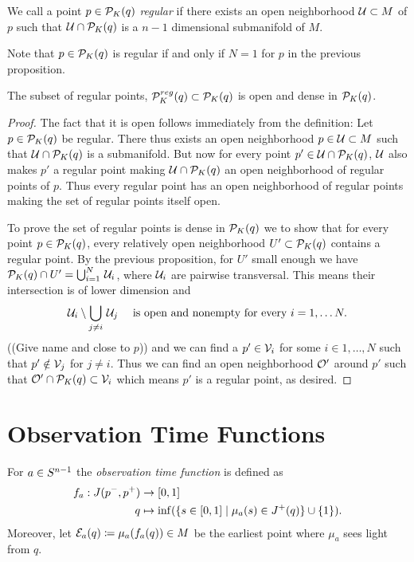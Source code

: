 \begin{definition}\label{def:regpt}
We call a point $p\in {\mathcal{P}}_K(q)$ \emph{regular} if there exists an open neighborhood ${\mathcal{U}}\subset M$ of $p$ such that ${\mathcal{U}}\cap {\mathcal{P}}_K(q)$ is a $n-1$ dimensional submanifold of $M$.

Note that $p\in {\mathcal{P}}_K(q)$ is regular if and only if $N=1$ for $p$ in the previous proposition.
\end{definition}


\begin{corollary}\label{cor:opendense}
    The subset of regular points, ${\mathcal{P}}^{reg}_K(q)\subset {\mathcal{P}}_K(q)$ is open and dense in ${\mathcal{P}}_K(q)$.
\end{corollary}
\begin{proof}
The fact that it is open follows immediately from the definition: Let $p\in {\mathcal{P}}_K(q)$ be regular. There thus exists an open neighborhood $p\in {\mathcal{U}}\subset M$ such that $\mathcal{U} \cap {\mathcal{P}}_K(q)$ is a submanifold. But now for every point $p'\in \mathcal{U}\cap{\mathcal{P}}_K(q)$, ${\mathcal{U}}$ also makes $p'$ a regular point making $\mathcal{U}\cap{\mathcal{P}}_K(q)$ an open neighborhood of regular points of $p$. Thus every regular point has an open neighborhood of regular points making the set of regular points itself open.

To prove the set of regular points is dense in ${{\mathcal{P}}_K(q)}$ we to show that for every point $p\in {\mathcal{P}}_K(q)$, every relatively open neighborhood $U'\subset{\mathcal{P}}_K(q)$ contains a regular point. By the previous proposition, for $U'$ small enough we have ${\mathcal{P}}_K(q)\cap U' = \bigcup_{i=1}^N\,\mathcal{U}_i$, where $\mathcal{U}_i$ are pairwise transversal. This means their intersection is of lower dimension and 
\[
    \mathcal{U}_i \setminus \bigcup_{j\neq i}\, \mathcal{U}_j \quad \text{ is open and nonempty for every }i=1,\dots N.
\]
((Give name and close to $p$))
and we can find a $p'\in {\mathcal{V}}_i$ for some $i\in 1,\dots,N$ such that $p'\notin {\mathcal{V}}_j$ for $j\neq i$. Thus we can find an open neighborhood ${\mathcal{O}}'$ around $p'$ such that ${\mathcal{O}}'\cap {\mathcal{P}}_K(q)\subset {\mathcal{V}}_i$ which means $p'$ is a regular point, as desired.
\end{proof}

\section{Observation Time Functions}
\begin{definition}\label{def:observationtime}
For $a\in {S^{n-1}}$ the \emph{observation time function} 
is defined as 
\begin{align*}
    f_a:J(p^-,p^+)&\to [0,1]\\
    q&\mapsto\inf(\{s\in [0,1] \mid \mu_a(s)\in J^+(q)\}\cup \{1\}).
\end{align*}
Moreover, let ${\mathcal{E}}_a(q)\coloneqq\mu_a(f_a(q))\in M$ be the earliest point where $\mu_a$ sees light from $q$.
\end{definition}

